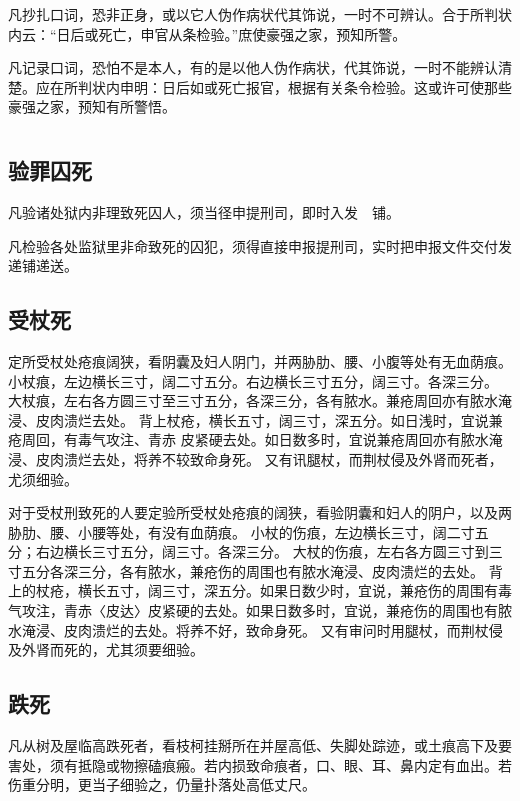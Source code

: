 \documentclass[12pt,UTF8]{ctexbook}
\begin{document}
凡抄扎口词，恐非正身，或以它人伪作病状代其饰说，一时不可辨认。合于所判状内云：“日后或死亡，申官从条检验。”庶使豪强之家，预知所警。


凡记录口词，恐怕不是本人，有的是以他人伪作病状，代其饰说，一时不能辨认清楚。应在所判状内申明：日后如或死亡报官，根据有关条令检验。这或许可使那些豪强之家，预知有所警悟。


\part{}

\chapter{验罪囚死}

凡验诸处狱内非理致死囚人，须当径申提刑司，即时入发　铺。


凡检验各处监狱里非命致死的囚犯，须得直接申报提刑司，实时把申报文件交付发递铺递送。


\chapter{受杖死}

定所受杖处疮痕阔狭，看阴囊及妇人阴门，并两胁肋、腰、小腹等处有无血荫痕。
小杖痕，左边横长三寸，阔二寸五分。右边横长三寸五分，阔三寸。各深三分。
大杖痕，左右各方圆三寸至三寸五分，各深三分，各有脓水。兼疮周回亦有脓水淹浸、皮肉溃烂去处。
背上杖疮，横长五寸，阔三寸，深五分。如日浅时，宜说兼疮周回，有毒气攻注、青赤 皮紧硬去处。如日数多时，宜说兼疮周回亦有脓水淹浸、皮肉溃烂去处，将养不较致命身死。
又有讯腿杖，而荆杖侵及外肾而死者，尤须细验。



对于受杖刑致死的人要定验所受杖处疮痕的阔狭，看验阴囊和妇人的阴户，以及两胁肋、腰、小腰等处，有没有血荫痕。
小杖的伤痕，左边横长三寸，阔二寸五分；右边横长三寸五分，阔三寸。各深三分。
大杖的伤痕，左右各方圆三寸到三寸五分各深三分，各有脓水，兼疮伤的周围也有脓水淹浸、皮肉溃烂的去处。
背上的杖疮，横长五寸，阔三寸，深五分。如果日数少时，宜说，兼疮伤的周围有毒气攻注，青赤〈皮达〉皮紧硬的去处。如果日数多时，宜说，兼疮伤的周围也有脓水淹浸、皮肉溃烂的去处。将养不好，致命身死。
又有审问时用腿杖，而荆杖侵及外肾而死的，尤其须要细验。


\chapter{跌死}

凡从树及屋临高跌死者，看枝柯挂掰所在并屋高低、失脚处踪迹，或土痕高下及要害处，须有抵隐或物擦磕痕瘢。若内损致命痕者，口、眼、耳、鼻内定有血出。若伤重分明，更当子细验之，仍量扑落处高低丈尺。
\end{document}

